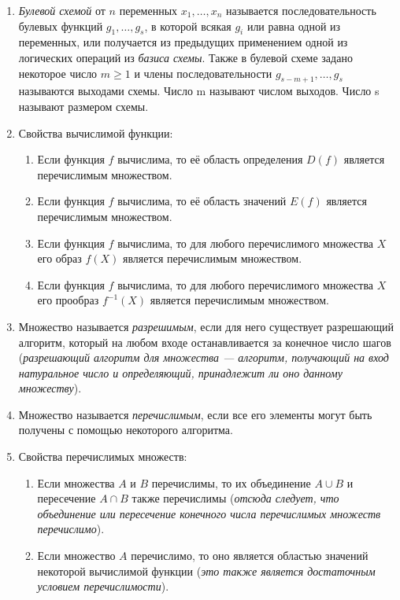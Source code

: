 \documentclass[a4paper,12pt]{article}
\begin{document}
\begin{enumerate}
        \item 
        \textit{Булевой схемой} от $n$ переменных $x_1, \ldots, x_n$ называется последовательность булевых функций $g_1, \ldots, g_s$, в которой всякая $g_i$ или равна одной из переменных,
        или получается из предыдущих применением одной из логических операций из \textit{базиса схемы}. Также в булевой схеме задано некоторое число $m \geq 1$
        и члены последовательности $g_{s-m+1}, \ldots, g_s$ называются выходами схемы.
        Число m называют числом выходов. Число s называют размером схемы.
		\item
        Свойства вычислимой функции:
        \begin{enumerate}
            \item Если функция $f$ вычислима, то её область определения $D(f)$ является перечислимым множеством.
            \item Если функция $f$ вычислима, то её область значений $E(f)$ является перечислимым множеством.
            \item Если функция $f$ вычислима, то для любого перечислимого множества $X$ его образ $f(X)$ является перечислимым множеством.
            \item Если функция $f$ вычислима, то для любого перечислимого множества $X$ его прообраз $f^{-1}(X)$ является перечислимым множеством.
        \end{enumerate}
        \item
        Множество называется \textit{разрешимым}, если для него существует разрешающий алгоритм, который на любом входе останавливается за конечное число шагов ({\itshape разрешающий алгоритм для множества --- алгоритм, получающий на вход натуральное число и определяющий, принадлежит ли оно данному множеству}).
        \item
        Множество называется \textit{перечислимым}, если все его элементы могут быть получены с помощью некоторого алгоритма.
        \item
        Свойства перечислимых множеств:
        \begin{enumerate}
            \item Если множества $A$ и $B$ перечислимы, то их объединение $A \cup B$ и пересечение $A \cap B$ также перечислимы (\textit{отсюда следует, что объединение или пересечение конечного числа перечислимых множеств перечислимо}).
            \item Если множество $A$ перечислимо, то оно является областью значений некоторой вычислимой функции (\textit{это также является достаточным условием перечислимости}).

\end{enumerate}
\end{enumerate}
\end{document}

